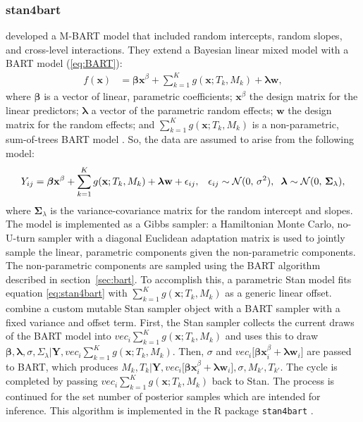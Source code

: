 \documentclass[3p,12pt,a4paper]{elsarticle}
\begin{document}
\subsubsection{stan4bart}
\citet{dorie2022} developed a M-BART model that included random intercepts, random slopes, and cross-level interactions. They extend a Bayesian linear mixed model with a BART model (\ref{eq:BART}):
\begin{align}
    \label{eq:stan4bart}
    f(\textbf{x}) &= \boldsymbol{\beta}\mathbf{x}^{\beta} + \sum^{K}_{k=1}g(\textbf{x}; T_{k}, M_{k}) + \boldsymbol{\lambda}\mathbf{w},
\end{align} where $\boldsymbol{\beta}$ is a vector of linear, parametric coefficients; $\mathbf{x}^{\beta}$ the design matrix for the linear predictors; $\boldsymbol{\lambda}$ a vector of the parametric random effects; $\mathbf{w}$ the design matrix for the random effects; and $\sum^{K}_{k=1}g(\textbf{x}; T_{k}, M_{k})$ is a non-parametric, sum-of-trees BART model \citep{dorie2022}. So, the data are assumed to arise from the following model:
\begin{align}
    \label{eq:stan4bart_model}
    Y_{ij} = \boldsymbol{\beta}\mathbf{x}^{\beta} + \sum^{K}_{k=1}g(\textbf{x}; T_{k}, M_{k}) + \boldsymbol{\lambda}\mathbf{w} + \epsilon_{ij}, & &\epsilon_{ij} \sim \mathcal{N}(0,\,\sigma^{2}), \hspace{.2cm} \boldsymbol{\lambda} \sim \mathcal{N}(0,\,\boldsymbol{\Sigma}_{\lambda}),
\end{align} where $\boldsymbol{\Sigma}_{\lambda}$ is the variance-covariance matrix for the random intercept and slopes. The model is implemented as a Gibbs sampler: a  Hamiltonian Monte Carlo, no-U-turn sampler with a diagonal Euclidean adaptation matrix is used to jointly sample the linear, parametric components given the non-parametric components. The non-parametric components are sampled using the BART algorithm described in section~\ref{sec:bart}. To accomplish this, a parametric Stan model \citep{lee2017} fits equation \ref{eq:stan4bart} with $\sum^{K}_{k=1}g(\textbf{x}; T_{k}, M_{k})$ as a generic linear offset. \citet{dorie2022} combine a custom mutable Stan sampler object with a BART sampler with a fixed variance and offset term. First, the Stan sampler collects the current draws of the BART model into $vec_i\sum^{K}_{k=1}g(\textbf{x}; T_{k}, M_{k})$ and uses this to draw $\mathbf{\beta}, \mathbf{\lambda}, \sigma, \Sigma_\lambda | \mathbf{Y}, vec_i\sum^{K}_{k=1}g(\textbf{x}; T_{k}, M_{k})$. Then, $\sigma$ and $vec_i\big[\boldsymbol{\beta}\mathbf{x}_i^{\beta} + \boldsymbol{\lambda}\mathbf{w}_i\big]$ are passed to BART, which produces $M_k,T_k | \mathbf{Y}, vec_i\big[\boldsymbol{\beta}\mathbf{x}_i^{\beta} + \boldsymbol{\lambda}\mathbf{w}_i\big], \sigma, M_{k'}, T_{k'}$. The cycle is completed by passing $vec_i\sum^{K}_{k=1}g(\textbf{x}; T_{k}, M_{k})$ back to Stan. The process is continued for the set number of posterior samples which are intended for inference. This algorithm is implemented in the R package \texttt{stan4bart} \citep{dorie2023a}.
\end{document}
